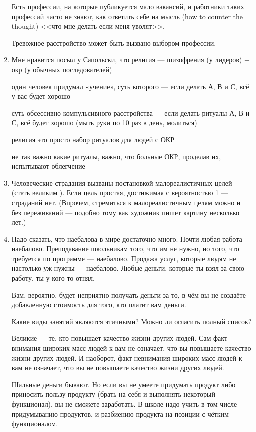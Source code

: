 \documentclass[11pt]{article}
\theoremstyle{remark}
\theoremstyle{definition}
\begin{document}
\begin{enumerate}
Есть профессии, на которые публикуется мало вакансий, и работники таких профессий часто не знают, как ответить себе на мысль (how to counter the thought) <<что мне делать если меня уволят>>.

Тревожное расстройство может быть вызвано выбором профессии.





\item Мне нравится посыл у Сапольски, что религия --- шизофрения (у лидеров) + окр (у обычных последователей)

один человек придумал «учение», суть которого — если делать А, В и С, всё у вас будет хорошо

суть обсессивно-компульсивного расстройства — если делать ритуалы А, В и С, всё будет хорошо (мыть руки по 10 раз в день, молиться)

религия это просто набор ритуалов для людей с ОКР

не так важно какие ритуалы, важно, что больные ОКР, проделав их, испытывают облегчение





\item Человеческие страдания вызваны постановкой малореалистичных целей (стать великим ). Если цель простая, достижимая с вероятностью 1 --- страданий нет. (Впрочем, стремиться к малореалистичным целям можно и без переживаний --- подобно тому как художник пишет картину несколько лет.)

\item Надо сказать, что наебалова в мире достаточно много. Почти любая работа --- наебалово. Преподавание школьникам того, что им не нужно, но того, что требуется по программе --- наебалово. Продажа услуг, которые людям не настолько уж нужны --- наебалово. Любые деньги, которые ты взял за свою работу, ты у кого-то отнял.

Вам, вероятно, будет неприятно получать деньги за то, в чём вы не создаёте добавленную стоимость для того, кто платит вам деньги.

Какие виды занятий являются этичными? Можно ли огласить полный список?

Великие --- те, кто повышает качество жизни других людей. Сам факт внимания широких масс людей к вам не означает, что вы повышаете качество жизни других людей. И наоборот, факт невнимания широких масс людей к вам не означает, что вы не повышаете качество жизни других людей.

Шальные деньги бывают. Но если вы не умеете придумать продукт либо приносить пользу продукту (брать на себя и выполнять некоторый функционал), вы не сможете заработать. В школе надо учить в том числе придумыванию продуктов, и разбиению продукта на позиции с чётким функционалом.





\end{enumerate}
\end{document}
